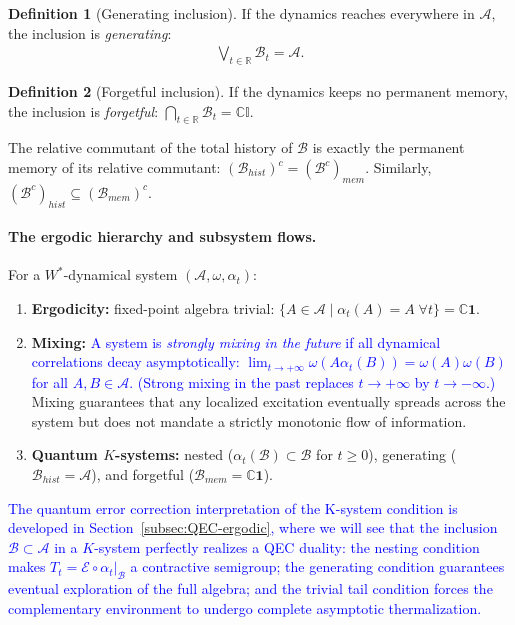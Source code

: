 \documentclass[a4paper,11pt]{article}
\theoremstyle{definition}
\newtheorem{definition}{Definition}[section]
\theoremstyle{remark}
\newcommand{\id}{\mathbb{I}}
\newcommand{\mA}{\mathcal{A}}
\newcommand{\mB}{\mathcal{B}}
\begin{document}
\begin{definition}[Generating inclusion]\label{def:generating}
If the dynamics reaches everywhere in $\mA$, the inclusion is \emph{generating}:
\begin{align}\label{geneating}
    \bigvee_{t\in\mathbb{R}}\mB_t=\mA.
\end{align}
\end{definition}
 
\begin{definition}[Forgetful inclusion]
If the dynamics keeps no permanent memory, the inclusion is \emph{forgetful}:
$\bigcap_{t\in\mathbb{R}}\mB_t=\mathbb{C}\id$.
\end{definition}
 
The relative commutant of the total history of $\mathcal{B}$ is exactly the permanent
memory of its relative commutant:
$({\mathcal{B}_{hist}})^c = (\mathcal{B}^c)_{mem}$.
Similarly, $(\mathcal{B}^c)_{hist} \subseteq (\mathcal{B}_{mem})^c$.
 
\paragraph{The ergodic hierarchy and subsystem flows.}
For a $W^*$-dynamical system $(\mathcal{A}, \omega, \alpha_t)$:
\begin{enumerate}
    \item \textbf{Ergodicity:} fixed-point algebra trivial:
    $\{A \in \mathcal{A} \mid \alpha_t(A) = A\; \forall t\} = \mathbb{C}\mathbf{1}$.
 
    \item \textbf{Mixing:} \textcolor{blue}{A system is \emph{strongly mixing in the future} if all
    dynamical correlations decay asymptotically:
    $\lim_{t \to +\infty} \omega(A \alpha_t(B)) = \omega(A)\omega(B)$ for all
    $A, B \in \mathcal{A}$.  (Strong mixing in the past replaces $t\to+\infty$ by
    $t\to-\infty$.)}  Mixing guarantees that any localized excitation eventually spreads
    across the system but does not mandate a strictly monotonic flow of information.
 
    \item \textbf{Quantum $K$-systems:} nested
    ($\alpha_t(\mathcal{B}) \subset \mathcal{B}$ for $t \ge 0$),
    generating ($\mathcal{B}_{hist} = \mathcal{A}$), and forgetful
    ($\mathcal{B}_{mem} = \mathbb{C}\mathbf{1}$).
\end{enumerate}
 
\textcolor{blue}{The quantum error correction interpretation of the K-system condition is developed in
Section~\ref{subsec:QEC-ergodic}, where we will see that the inclusion $\mB\subset\mA$
in a $K$-system perfectly realizes a QEC duality: the nesting condition makes
$T_t = \mathcal{E}\circ\alpha_t|_\mathcal{B}$ a contractive semigroup; the generating
condition guarantees eventual exploration of the full algebra; and the trivial tail
condition forces the complementary environment to undergo complete asymptotic
thermalization.}
 
\end{document}

